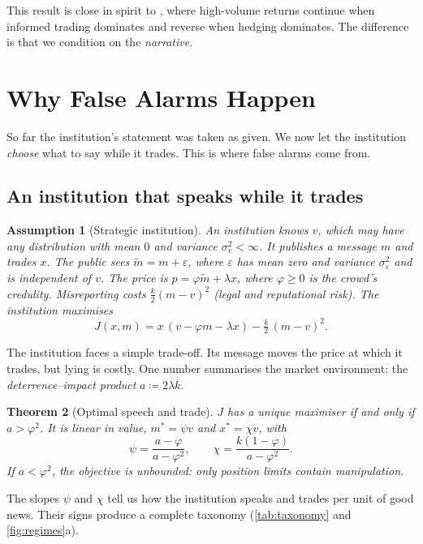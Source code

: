 \documentclass[11pt,a4paper]{article}
\theoremstyle{sci}
\newtheorem{theorem}{Theorem}[section]
\theoremstyle{scidef}
\newtheorem{assumption}[theorem]{Assumption}
\begin{document}
This result is close in spirit to \citet{llorente2002}, where high-volume returns continue when informed trading dominates and reverse when hedging dominates. The difference is that we condition on the \emph{narrative}.

\section{Why False Alarms Happen}\label{sec:strategic}

So far the institution's statement was taken as given. We now let the institution \emph{choose} what to say while it trades. This is where false alarms come from.

\subsection{An institution that speaks while it trades}

\begin{assumption}[Strategic institution]\label{ass:strategic}
An institution knows $v$, which may have any distribution with mean $0$ and variance $\sigma_v^2<\infty$. It publishes a message $m$ and trades $x$. The public sees $\tilde m=m+\varepsilon$, where $\varepsilon$ has mean zero and variance $\sigma_\varepsilon^2$ and is independent of $v$. The price is $p=\varphi\tilde m+\lambda x$, where $\varphi\ge0$ is the crowd's \emph{credulity}. Misreporting costs $\tfrac k2(m-v)^2$ (legal and reputational risk). The institution maximises
\[
  J(x,m)=x\,(v-\varphi m-\lambda x)-\tfrac k2\,(m-v)^2 .
\]
\end{assumption}

The institution faces a simple trade-off. Its message moves the price at which it trades, but lying is costly. One number summarises the market environment: the \emph{deterrence--impact product} $a\coloneqq2\lambda k$.

\begin{theorem}[Optimal speech and trade]\label{thm:speech}
$J$ has a unique maximiser if and only if $a>\varphi^2$. It is linear in value, $m^\ast=\psi v$ and $x^\ast=\chi v$, with
\[
  \psi=\frac{a-\varphi}{a-\varphi^2},\qquad \chi=\frac{k(1-\varphi)}{a-\varphi^2}.
\]
If $a<\varphi^2$, the objective is unbounded: only position limits contain manipulation.
\end{theorem}

The slopes $\psi$ and $\chi$ tell us how the institution speaks and trades per unit of good news. Their signs produce a complete taxonomy (\cref{tab:taxonomy} and \cref{fig:regimes}a).
\end{document}
